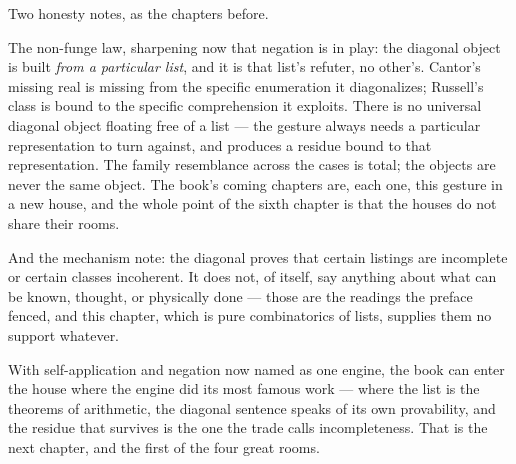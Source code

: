 Two honesty notes, as the chapters before.

The non-funge law, sharpening now that negation is in play: the diagonal
object is built \emph{from a particular list}, and it is that list's
refuter, no other's. Cantor's missing real is missing from the specific
enumeration it diagonalizes; Russell's class is bound to the specific
comprehension it exploits. There is no universal diagonal object floating
free of a list --- the gesture always needs a particular representation
to turn against, and produces a residue bound to that representation. The
family resemblance across the cases is total; the objects are never the
same object. The book's coming chapters are, each one, this gesture in a
new house, and the whole point of the sixth chapter is that the houses
do not share their rooms.

And the mechanism note: the diagonal proves that certain listings are
incomplete or certain classes incoherent. It does not, of itself, say
anything about what can be known, thought, or physically done --- those
are the readings the preface fenced, and this chapter, which is pure
combinatorics of lists, supplies them no support whatever.

With self-application and negation now named as one engine, the book can
enter the house where the engine did its most famous work --- where the
list is the theorems of arithmetic, the diagonal sentence speaks of its
own provability, and the residue that survives is the one the trade calls
incompleteness. That is the next chapter, and the first of the four
great rooms.
